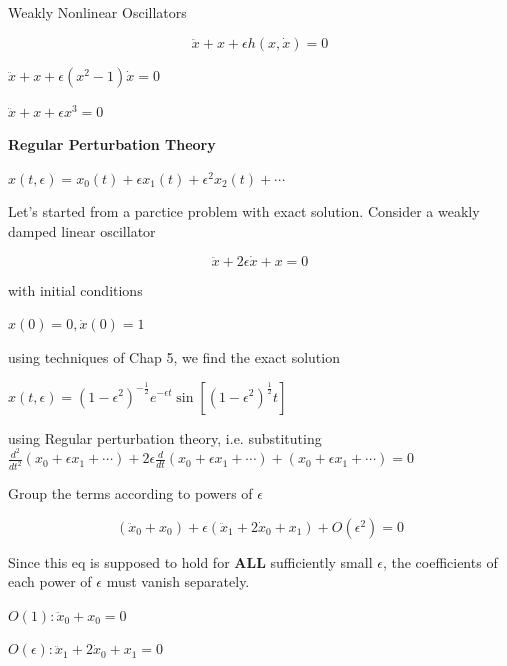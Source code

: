 \documentclass[9pt,aspectratio=43,mathserif,table]{beamer}
\begin{document}
\begin{frame}[label=current]{Weakly Nonlinear Oscillators}

  \begin{multicols}{2}
    $$\ddot x + x + \epsilon h(x, \dot x) = 0$$

    \medskip

    $\ddot x + x + \epsilon(x^2 -1) \dot x = 0$

    $\ddot x + x + \epsilon x ^3 = 0$

    \textbf{Regular Perturbation Theory}

    $x(t,\epsilon) = x_0(t) + \epsilon x_1(t) + \epsilon^2 x_2(t) + \cdots$

    Let's started from a parctice problem with exact solution. Consider a weakly damped linear oscillator

    $$\ddot x + 2 \epsilon \dot x  + x = 0 $$

    with initial conditions

    $x(0) = 0, \dot x(0) = 1$

    using techniques of Chap 5, we find the exact solution 

    $x(t,\epsilon) = (1-\epsilon^2)^{-\frac{ 1}{2}} e^{-\epsilon t} \sin [(1-\epsilon^2)^{\frac{ 1}{2}}t]$

    using Regular perturbation theory, i.e. substituting
    $\frac{ d^2}{dt^2}(x_0 + \epsilon x_1 + \cdots) + 2 \epsilon \frac{ d}{dt}(x_0 + \epsilon x_1 + \cdots) + (x_0 + \epsilon x_1 + \cdots) = 0 $

    Group the terms according to powers of $\epsilon$

    $$(\ddot x_0 + x_0) + \epsilon(\ddot x_1 + 2 \dot x_0 + x_1) + O(\epsilon^2) =0$$

    Since this eq is supposed to hold for \textbf{ALL} sufficiently small $\epsilon$, the coefficients of each power of $\epsilon$ must vanish separately.

    $O(1): \ddot x_0 + x_0 = 0$

    $O(\epsilon): \ddot x_1 + 2\dot x_0 + x_1 = 0$

  \end{multicols}
\end{frame}
\end{document}

